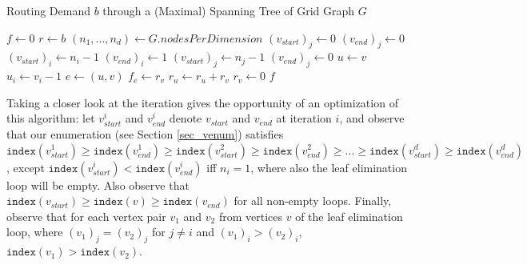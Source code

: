 \begin{algorithm}
\caption{Routing Demand $b$ through a (Maximal) Spanning Tree of Grid Graph $G$}\label{alg_mst}
\begin{algorithmic}[1]
\State $f\gets 0$
\State $r\gets b$
\State $(n_1,...,n_d)\gets G.nodesPerDimension$
        \State $\left(v_{start}\right)_j\gets 0$
        \State $\left(v_{end}\right)_j\gets 0$
    \EndFor
    \State $\left(v_{start}\right)_i\gets n_i-1$
    \State $\left(v_{end}\right)_i\gets 1$
        \State $\left(v_{start}\right)_j\gets n_j-1$
        \State $\left(v_{end}\right)_j\gets 0$
    \EndFor
        \State $u\gets v$
        \State $u_i\gets v_i-1$
        \State $e\gets (u,v)$
        \State $f_e\gets r_v$
        \State $r_u\gets r_u+r_v$
        \State $r_v\gets 0$
    \EndFor
\EndFor
\State \Return $f$
\EndProcedure
\end{algorithmic}
\end{algorithm}
Taking a closer look at the iteration gives the opportunity of an optimization of this algorithm: let $v_{start}^i$ and $v_{end}^i$ denote $v_{start}$ and $v_{end}$ at iteration $i$, and observe that our enumeration (see Section \ref{sec_venum}) satisfies $\texttt{index}(v_{start}^1)\geq \texttt{index}(v_{end}^1)\geq \texttt{index}(v_{start}^2)\geq \texttt{index}(v_{end}^2)\geq ...\geq \texttt{index}(v_{start}^d)\geq \texttt{index}(v_{end}^d)$, except $\texttt{index}(v_{start}^i)< \texttt{index}(v_{end}^i)$ iff $n_i=1$, where also the leaf elimination loop will be empty. Also observe that $\texttt{index}(v_{start})\geq \texttt{index}(v)\geq \texttt{index}(v_{end})$ for all non-empty loops. Finally, observe that for each vertex pair $v_1$ and $v_2$ from vertices $v$ of the leaf elimination loop, where $\left(v_1\right)_j=\left(v_2\right)_j$ for $j\neq i$ and $\left(v_1\right)_i>\left(v_2\right)_i$, $\texttt{index}(v_1)>\texttt{index}(v_2)$.\\
